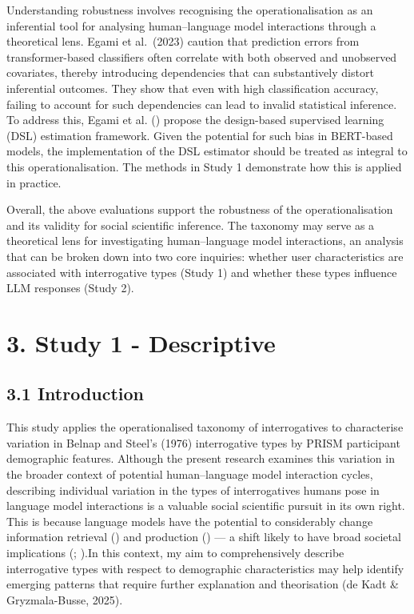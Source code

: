 \documentclass[
  12pt,
]{article}
\begin{document}
Understanding robustness involves recognising the operationalisation as an inferential tool for analysing human--language model interactions through a theoretical lens. Egami et al.~(2023) caution that prediction errors from transformer-based classifiers often correlate with both observed and unobserved covariates, thereby introducing dependencies that can substantively distort inferential outcomes. They show that even with high classification accuracy, failing to account for such dependencies can lead to invalid statistical inference. To address this, Egami et al. () propose the design-based supervised learning (DSL) estimation framework. Given the potential for such bias in BERT-based models, the implementation of the DSL estimator should be treated as integral to this operationalisation. The methods in Study 1 demonstrate how this is applied in practice.

Overall, the above evaluations support the robustness of the operationalisation and its validity for social scientific inference. The taxonomy may serve as a theoretical lens for investigating human--language model interactions, an analysis that can be broken down into two core inquiries: whether user characteristics are associated with interrogative types (Study 1) and whether these types influence LLM responses (Study 2).

\section{3. Study 1 - Descriptive}\label{study-1---descriptive}

\subsection{3.1 Introduction}\label{introduction-1}

This study applies the operationalised taxonomy of interrogatives to characterise variation in Belnap and Steel's (1976) interrogative types by PRISM participant demographic features. Although the present research examines this variation in the broader context of potential human--language model interaction cycles, describing individual variation in the types of interrogatives humans pose in language model interactions is a valuable social scientific pursuit in its own right. This is because language models have the potential to considerably change information retrieval () and production () --- a shift likely to have broad societal implications (; ).In this context, my aim to comprehensively describe interrogative types with respect to demographic characteristics may help identify emerging patterns that require further explanation and theorisation (de Kadt \& Gryzmala-Busse, 2025).
\end{document}
